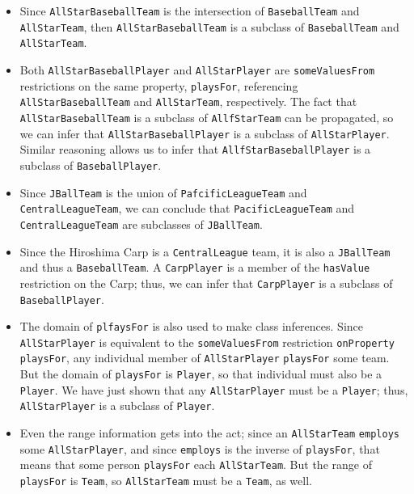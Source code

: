 \begin{itemize}
\item Since \texttt{AllStarBaseballTeam} is the intersection of \texttt{BaseballTeam} and
\texttt{AllStarTeam}, then \texttt{AllStarBaseballTeam} is a subclass of \texttt{BaseballTeam} and
\texttt{AllStarTeam}.

\item  Both \texttt{AllStarBaseballPlayer} and \texttt{AllStarPlayer} are \texttt{someValuesFrom}
restrictions
on the same property, \texttt{playsFor}, referencing \texttt{AllStarBaseballTeam} and
\texttt{AllStarTeam}, respectively. The fact that \texttt{AllStarBaseballTeam} is a
subclass of \texttt{AllfStarTeam} can be propagated, so we can infer that
\texttt{AllStarBaseballPlayer} is a subclass of \texttt{AllStarPlayer}. Similar reasoning
allows us to infer that \texttt{AllfStarBaseballPlayer} is a subclass of
\texttt{BaseballPlayer}.

\item  Since \texttt{JBallTeam} is the union of \texttt{PafcificLeagueTeam} and
\texttt{CentralLeagueTeam}, we can
conclude that \texttt{PacificLeagueTeam} and \texttt{CentralLeagueTeam} are subclasses of
\texttt{JBallTeam}.

\item Since the Hiroshima Carp is a \texttt{CentralLeague} team, it is also a
\texttt{JBallTeam} and thus a \texttt{BaseballTeam}. A \texttt{CarpPlayer} is a member of the \texttt{hasValue}
restriction on the Carp; thus, we can infer that \texttt{CarpPlayer} is a
subclass of \texttt{BaseballPlayer}.

\item The domain of \texttt{plfaysFor} is also used to make class inferences. Since
\texttt{AllStarPlayer} is
equivalent to the \texttt{someValuesFrom} restriction \texttt{onProperty} \texttt{playsFor}, any
individual member of \texttt{AllStarPlayer} \texttt{playsFor} some team. But the domain of
\texttt{playsFor} is \texttt{Player}, so that individual must also be a \texttt{Player}. We have
just shown that any \texttt{AllStarPlayer} must be a \texttt{Player}; thus, \texttt{AllStarPlayer}
is a subclass of \texttt{Player}.

\item Even the range information gets into the act; since an \texttt{AllStarTeam}
\texttt{employs} some
\texttt{AllStarPlayer}, and since \texttt{employs} is the inverse of \texttt{playsFor}, that means
that some person \texttt{playsFor} each \texttt{AllStarTeam}. But the range of \texttt{playsFor} is
\texttt{Team}, so \texttt{AllStarTeam} must be a \texttt{Team}, as well.


\end{itemize}



